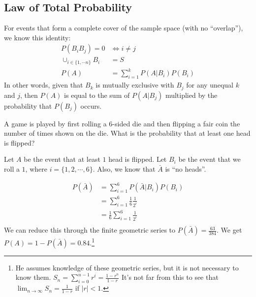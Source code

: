                 \subsection{Law of Total Probability} %
                \label{sub:law_of_total_probability}
                    For events that form a complete cover of the sample space (with no ``overlap''), we know this identity:
                    \begin{align*}
                        P(B_iB_j) = 0 &\iff i \ne j \\
                        \cup_{i \in \{ 1, \cdots n \}} B_i &= S \\
                        P (A) &= \sum_{i = 1}^{k} P(A | B_i) P(B_i)
                    \end{align*}
                    In other words, given that $B_k$ is mutually exclusive with $B_j$ for any unequal $k$ and $j$, then $P(A)$ is equal to the sum of $P(A|B_j)$ multiplied by the probability that $P(B_j)$ occurs.

                    \ex A game is played by first rolling a 6-sided die and then flipping a fair coin the number of times shown on the die.
                    What is the probability that at least one head is flipped?

                    Let $A$ be the event that at least $1$ head is flipped.
                    Let $B_i$ be the event that we roll a $1$, where $i = \{ 1, 2, \cdots, 6 \}$.
                    Also, we know that $\bar{A}$ is ``no heads''.

                    \begin{align*}
                        P(\bar{A}) &= \sum_{i = 1}^6 P(\bar{A}|B_i) P(B_i) \\
                                   &= \sum_{i = 1}^6 \frac{1}{6} \frac{1}{2^i} \\
                                   &= \frac{1}{6} \sum_{i = 1}^6 \frac{1}{2^i} \\
                    \end{align*}
                    We can reduce this through the finite geometric series to $P(\bar{A}) = \frac{63}{384}$.
                    We get $P(A) = 1 - P(\bar{A}) = 0.84$.\footnote{
                        He assumes knowledge of these geometric series, but it is not necessary to know them.
                        $S_n = \sum_{i=0}^{n-1} r^i = \frac{1 - r^n}{1-r}$
                        It's not far from this to see that $\lim_{n\to \infty} S_n = \frac{1}{1-r}$ if $|r| < 1$.
                    }
